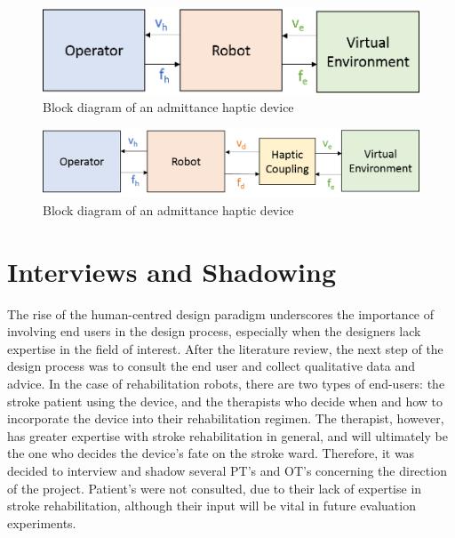 \documentclass[12pt]{report}
\begin{document}
	
	
	\begin{figure}[t] 
		\centering
		\includegraphics[width=0.75\linewidth]{haptics_admittance}
		\caption{Block diagram of an admittance haptic device}
		\label{fig:haptic_adm}
	\end{figure}	
	
	\begin{figure}[t] 
		\centering
		\includegraphics[width=0.75\linewidth]{haptic_admittance_coupling}
		\caption{Block diagram of an admittance haptic device}
		\label{fig:haptic_adm_coup}
	\end{figure}	
	
	
\section{Interviews and Shadowing}

%
	
	The rise of the human-centred design paradigm underscores the importance of involving end users in the design process, especially when the designers lack expertise in the field of interest. After the literature review, the next step of the design process was to consult the end user and collect qualitative data and advice. In the case of rehabilitation robots, there are two types of end-users: the stroke patient using the device, and the therapists who decide when and how to incorporate the device into their rehabilitation regimen. The therapist, however, has greater expertise with stroke rehabilitation in general, and will ultimately be the one who decides the device's fate on the stroke ward. Therefore, it was decided to interview and shadow several PT's and OT's concerning the direction of the project. Patient's were not consulted, due to their lack of expertise in stroke rehabilitation, although their input will be vital in future evaluation experiments. 
	
\end{document}
